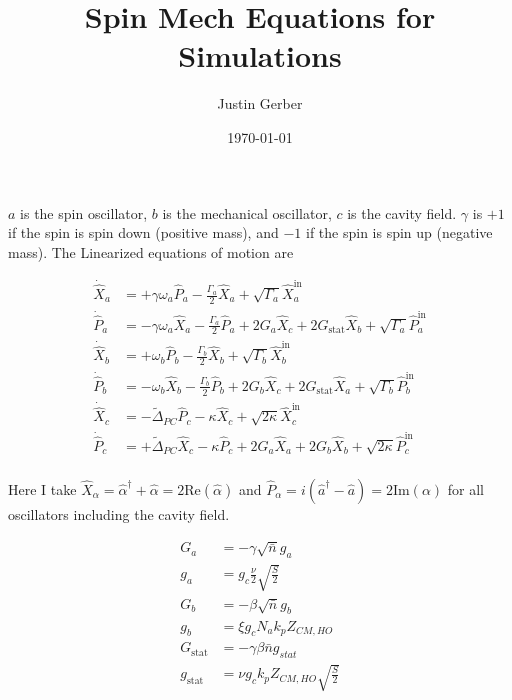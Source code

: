 \documentclass[12pt]{article}
\begin{document}
\title{Spin Mech Equations for Simulations}
\author{Justin Gerber}
\date{\today}
\maketitle

$a$ is the spin oscillator, $b$ is the mechanical oscillator, $c$ is the cavity field. $\gamma$ is $+1$ if the spin is spin down (positive mass), and $-1$ if the spin is spin up (negative mass).
The Linearized equations of motion are

\begin{align*}
\dot{\hat{X}}_a &= +\gamma \omega_a \hat{P}_a -\frac{\Gamma_a}{2} \hat{X}_a + \sqrt{\Gamma_a}\hat{X}_a^{\text{in}}\\
\dot{\hat{P}}_a &= -\gamma \omega_a \hat{X}_a -\frac{\Gamma_a}{2} \hat{P}_a + 2 G_a \hat{X}_c + 2G_{\text{stat}}\hat{X}_b + \sqrt{\Gamma_a}\hat{P}_a^{\text{in}}\\
\dot{\hat{X}}_b &= +\omega_b \hat{P}_b -\frac{\Gamma_b}{2} \hat{X}_b + \sqrt{\Gamma_b}\hat{X}_b^{\text{in}}\\
\dot{\hat{P}}_b &= -\omega_b \hat{X}_b -\frac{\Gamma_b}{2} \hat{P}_b + 2 G_b \hat{X}_c + 2G_{\text{stat}}\hat{X}_a + \sqrt{\Gamma_b}\hat{P}_b^{\text{in}}\\
\dot{\hat{X}}_c &= -\tilde{\Delta}_{PC} \hat{P}_c - \kappa \hat{X}_c + \sqrt{2\kappa}\hat{X}_c^{\text{in}}\\
\dot{\hat{P}}_c &= +\tilde{\Delta}_{PC} \hat{X}_c - \kappa \hat{P}_c + 2 G_a \hat{X}_a + 2 G_b \hat{X}_b + \sqrt{2\kappa}\hat{P}_c^{\text{in}}\\
\end{align*}

Here I take $\hat{X}_{\alpha} = \hat{\alpha}^{\dag}+\hat{\alpha} = 2 \text{Re}(\hat{\alpha})$ and $\hat{P}_{\alpha} = i(\hat{a}^{\dagger}-\hat{a})= 2\text{Im}(\alpha)$ for all oscillators including the cavity field.

\begin{align}
G_a &= -\gamma \sqrt{\bar{n}} g_a\\
g_a &= g_c \frac{\nu}{2} \sqrt{\frac{S}{2}}\\
G_b &= -\beta \sqrt{\bar{n}} g_b\\
g_b &= \xi g_c N_a k_p Z_{CM,HO}\\
G_{\text{stat}} &= -\gamma \beta \bar{n} g_{stat}\\
g_{\text{stat}} &= \nu g_c k_p Z_{CM,HO} \sqrt{\frac{S}{2}}
\end{align}
\end{document}
